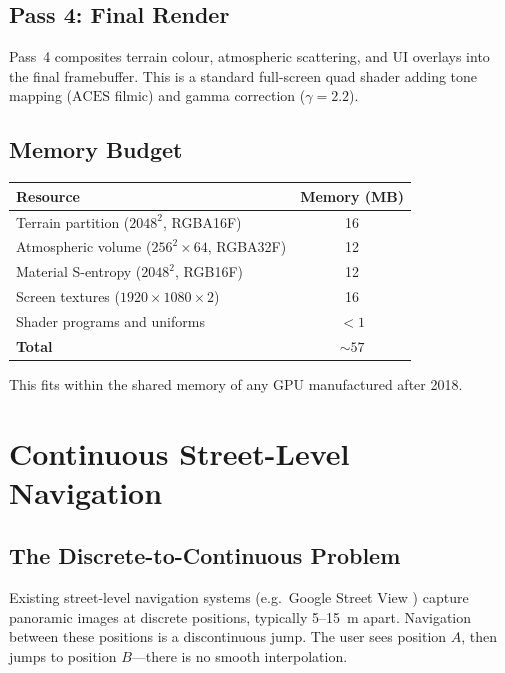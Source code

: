 \documentclass[10pt,twocolumn]{article}
\theoremstyle{definition}
\theoremstyle{remark}
\begin{document}
\subsection{Pass 4: Final Render}\label{sec:pass4}

Pass~4 composites terrain colour, atmospheric scattering, and
UI overlays into the final framebuffer.  This is a standard
full-screen quad shader adding tone mapping
($\mathrm{ACES}$ filmic) and gamma correction ($\gamma=2.2$).

\subsection{Memory Budget}\label{sec:memory}

\begin{center}
\small
\begin{tabular}{@{}lc@{}}
\toprule
\textbf{Resource} & \textbf{Memory (MB)}\\
\midrule
Terrain partition ($2048^2$, RGBA16F) & 16\\
Atmospheric volume ($256^2\times 64$, RGBA32F) & 12\\
Material S-entropy ($2048^2$, RGB16F) & 12\\
Screen textures ($1920\times 1080\times 2$) & 16\\
Shader programs and uniforms & ${<}1$\\
\midrule
\textbf{Total} & ${\sim}57$\\
\bottomrule
\end{tabular}
\end{center}

This fits within the shared memory of any GPU manufactured
after 2018.

\section{Continuous Street-Level Navigation}
\label{sec:streetview}

\subsection{The Discrete-to-Continuous Problem}
\label{sec:discrete}

Existing street-level navigation systems (e.g.\ Google Street
View \citep{Anguelov2010}) capture panoramic images at discrete
positions, typically 5--15~m apart.  Navigation between these
positions is a discontinuous jump.  The user sees position $A$,
then jumps to position $B$---there is no smooth interpolation.
\end{document}
